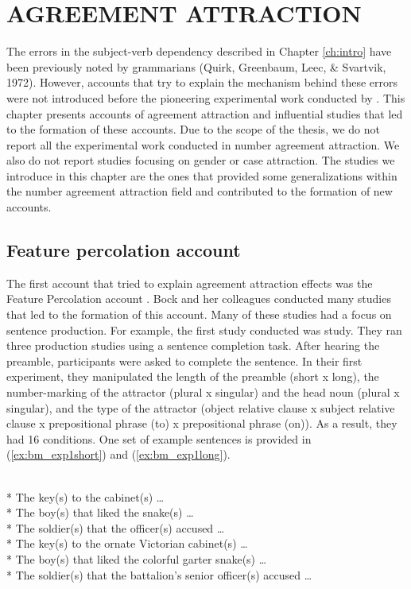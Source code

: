 \chapter{AGREEMENT ATTRACTION} \label{ch:accounts}

The errors in the subject-verb dependency described in Chapter \ref{ch:intro} have been previously noted by grammarians (Quirk, Greenbaum, Leec, \& Svartvik, 1972). However, accounts that try to explain the mechanism behind these errors were not introduced before the pioneering experimental work conducted by \citet{BockMiller:1991}. This chapter presents accounts of agreement attraction and influential studies that led to the formation of these accounts. Due to the scope of the thesis, we do not report all the experimental work conducted in number agreement attraction. We also do not report studies focusing on gender or case attraction. The studies we introduce in this chapter are the ones that provided some generalizations within the number agreement attraction field and contributed to the formation of new accounts.



\section{Feature percolation account} \label{sec:feature_perc}

The first account that tried to explain agreement attraction effects was the Feature Percolation account \citep{BockEberhard93}. Bock and her colleagues conducted many studies that led to the formation of this account. Many of these studies had a focus on sentence production. For example, the first study conducted was \cites{BockMiller:1991} study. They ran three production studies using a sentence completion task. After hearing the preamble, participants were asked to complete the sentence. In their first experiment, they manipulated the length of the preamble (short x long), the number-marking of the attractor (plural x singular) and the head noun (plural x singular), and the type of the attractor (object relative clause x subject relative clause x prepositional phrase (to) x prepositional phrase (on)). As a result, they had 16 conditions. One set of example sentences is provided in (\ref{ex:bm_exp1short}) and (\ref{ex:bm_exp1long}).

 \label{ex:bm_exp1short}
   \\* The {key(s)} to the {cabinet(s)} \ldots
   \\* The {boy(s)} that liked the {snake(s)} \ldots
   \\* The {soldier(s)} that the {officer(s)} accused \ldots
  \z
{} \label{ex:bm_exp1long}
   \\* The {key(s)} to the ornate Victorian {cabinet(s)} \ldots
   \\* The {boy(s)} that liked the colorful garter {snake(s)} \ldots
   \\* The {soldier(s)} that the battalion's senior {officer(s)} accused \ldots
  \z
\z

